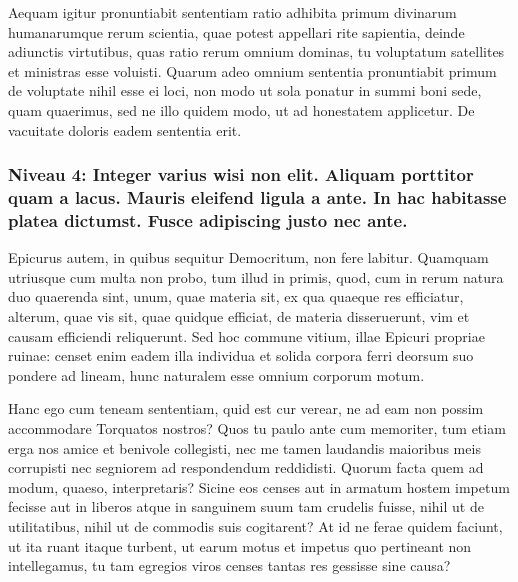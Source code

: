 \documentclass[twoside]{extreport}
\begin{document}
Aequam igitur pronuntiabit sententiam ratio adhibita primum divinarum
humanarumque rerum scientia, quae potest appellari rite sapientia,
deinde adiunctis virtutibus, quas ratio rerum omnium dominas, tu
voluptatum satellites et ministras esse voluisti. Quarum adeo omnium
sententia pronuntiabit primum de voluptate nihil esse ei loci, non modo
ut sola ponatur in summi boni sede, quam quaerimus, sed ne illo quidem
modo, ut ad honestatem applicetur. De vacuitate doloris eadem sententia
erit.

\hypertarget{niveau-4-integer-varius-wisi-non-elit.-aliquam-porttitor-quam-a-lacus.-mauris-eleifend-ligula-a-ante.-in-hac-habitasse-platea-dictumst.-fusce-adipiscing-justo-nec-ante.}{%
\subsubsection*{Niveau 4: Integer varius wisi non elit. Aliquam
porttitor quam a lacus. Mauris eleifend ligula a ante. In hac habitasse
platea dictumst. Fusce adipiscing justo nec
ante.}\label{niveau-4-integer-varius-wisi-non-elit.-aliquam-porttitor-quam-a-lacus.-mauris-eleifend-ligula-a-ante.-in-hac-habitasse-platea-dictumst.-fusce-adipiscing-justo-nec-ante.}}

Epicurus autem, in quibus sequitur Democritum, non fere labitur.
Quamquam utriusque cum multa non probo, tum illud in primis, quod, cum
in rerum natura duo quaerenda sint, unum, quae materia sit, ex qua
quaeque res efficiatur, alterum, quae vis sit, quae quidque efficiat, de
materia disseruerunt, vim et causam efficiendi reliquerunt. Sed hoc
commune vitium, illae Epicuri propriae ruinae: censet enim eadem illa
individua et solida corpora ferri deorsum suo pondere ad lineam, hunc
naturalem esse omnium corporum motum.

Hanc ego cum teneam sententiam, quid est cur verear, ne ad eam non
possim accommodare Torquatos nostros? Quos tu paulo ante cum memoriter,
tum etiam erga nos amice et benivole collegisti, nec me tamen laudandis
maioribus meis corrupisti nec segniorem ad respondendum reddidisti.
Quorum facta quem ad modum, quaeso, interpretaris? Sicine eos censes aut
in armatum hostem impetum fecisse aut in liberos atque in sanguinem suum
tam crudelis fuisse, nihil ut de utilitatibus, nihil ut de commodis suis
cogitarent? At id ne ferae quidem faciunt, ut ita ruant itaque turbent,
ut earum motus et impetus quo pertineant non intellegamus, tu tam
egregios viros censes tantas res gessisse sine causa?
\end{document}
